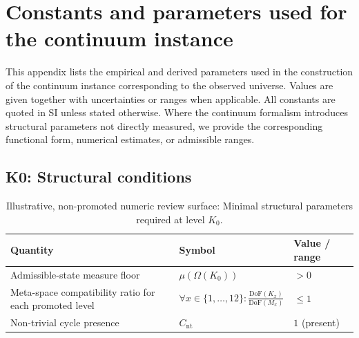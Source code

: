 
\section{Constants and parameters used for the continuum instance}
\label{app:synthesis-constants-and-parameters}

This appendix lists the empirical and derived parameters used in the construction
of the continuum instance corresponding to the observed universe.
Values are given together with uncertainties or ranges when applicable.
All constants are quoted in SI unless stated otherwise.
Where the continuum formalism introduces structural parameters not directly
measured, we provide the corresponding functional form, numerical estimates,
or admissible ranges.



\subsection*{K0: Structural conditions}

\begin{table}[htbp]
  \centering
  \caption{Illustrative, non-promoted numeric review surface: Minimal structural parameters required at level \(K_0\).}
  \label{tab:k0-structural-parameters}
\begin{tabular}{@{}L{0.44\textwidth}L{0.16\textwidth}L{0.23\textwidth}@{}}
    \hline
    Quantity & Symbol & Value / range \\
    \hline
    Admissible-state measure floor & \(\mu(\Omega(K_0))\)
        & \(> 0\) \\
    Meta-space compatibility ratio for each promoted level & \(\forall x \in \{1,\dots,12\}: \frac{\mathrm{DoF}(K_x)}{\mathrm{DoF}(M_x)}\)
        & \(\leq 1\) \\
    Non-trivial cycle presence & \(C_{\mathrm{nt}}\)
        & \(1\) (present) \\
    \hline
\end{tabular}
\end{table}

